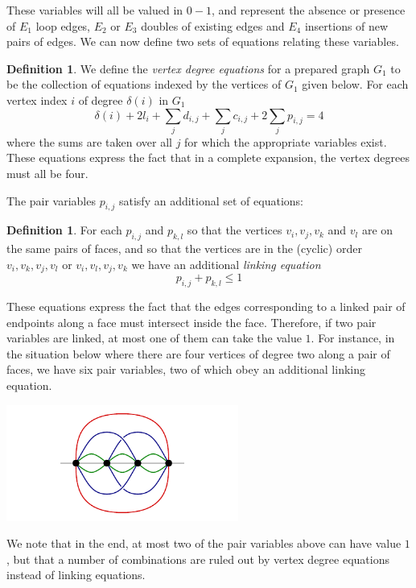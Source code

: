 \documentclass[amsmath,secnumarabic,floatfix,amssymb,nofootinbib,nobibnotes,letterpaper,11pt,tightenlines,showkeys]{revtex4}
\theoremstyle{definition}
\newtheorem{definition}[theorem]{Definition}
\newcommand{\loopinsert}{E_1}
\newcommand{\edgedouble}{E_2}
\newcommand{\cutedgedouble}{E_3}
\newcommand{\pairinsert}{E_4}
\begin{document}
These variables will all be valued in $0-1$, and represent the absence or presence of $\loopinsert$ loop edges, $\edgedouble$ or $\cutedgedouble$ doubles of existing edges and $\pairinsert$ insertions of new pairs of edges.
We can now define two sets of equations relating these variables.

\begin{definition}
We define the \emph{vertex degree equations} for a prepared graph $G_1$ to be the collection of equations indexed by the vertices of $G_1$ given below. For each vertex index $i$ of degree $\delta(i)$ in $G_1$
\begin{equation*}
\delta(i) + 2 l_i + \sum_j d_{i,j} + \sum_j c_{i,j} + 2 \sum_j p_{i,j} = 4
\end{equation*}
where the sums are taken over all $j$ for which the appropriate variables exist. These equations express the fact that in a complete expansion, the vertex degrees must all be four.
\end{definition}

The pair variables $p_{i,j}$ satisfy an additional set of equations:
\begin{definition}
For each $p_{i,j}$ and $p_{k,l}$ so that the vertices $v_i, v_j, v_k$ and $v_l$ are on the same pairs of faces, and so that the vertices are in the (cyclic) order $v_i, v_k, v_j, v_l$ or $v_i, v_l, v_j, v_k$ we have an additional \emph{linking equation}
\begin{equation*}
p_{i,j} + p_{k,l} \leq 1
\end{equation*}
\end{definition}

These equations express the fact that the edges corresponding to a linked pair of endpoints along a face must intersect inside the face. Therefore, if two pair variables are linked, at most one of them can take the value $1$. For instance, in the situation below where there are four vertices of degree two along a pair of faces, we have six pair variables, two of which obey an additional linking equation.
\begin{center}
\includegraphics[height=1.5in]{linked-ghost-pairs.pdf}
\end{center}
We note that in the end, at most two of the pair variables above can have value $1$, but that a number of combinations are ruled out by vertex degree equations instead of linking equations.
\end{document}
